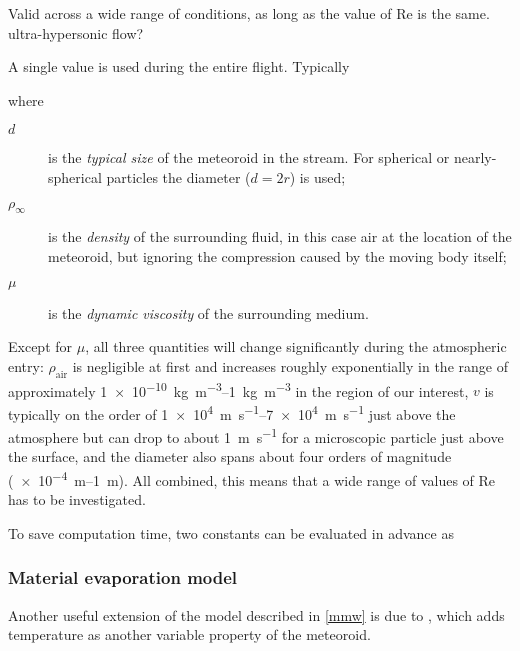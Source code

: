         Valid across a wide range of conditions, as long as the value of Re is the same.
        ultra-hypersonic flow?

        A single value is used during the entire flight. Typically


        where
        \begin{description}
            \item[$d$] is the \emph{typical size} of the meteoroid in the stream.
                For spherical or nearly-spherical particles the diameter ($d = 2r$) is used;
            \item[$\rho_\infty$] is the \emph{density} of the surrounding fluid, in this case
                air at the location of the meteoroid, but ignoring the compression caused
                by the moving body itself;
            \item[$\mu$] is the \emph{dynamic viscosity} of the surrounding medium.
        \end{description}

        Except for $\mu$, all three quantities will change significantly
        during the atmospheric entry: $\rho_\mathrm{air}$ is negligible at first
        and increases roughly exponentially in the range of approximately \SIrange{1e-10}{1}{\kilo\gram\per\metre\cubed}
        in the region of our interest, $v$ is typically on the order of \SIrange{1e4}{7e4}{\metre\per\second}
        just above the atmosphere but can drop to about \SI{1}{\metre\per\second}
        for a microscopic particle just above the surface, and the diameter also spans
        about four orders of magnitude (\SIrange{e-4}{1}{\metre}).
        All combined, this means that a wide range of values of $\mathrm{Re}$ has to be investigated.


        To save computation time, two constants can be evaluated in advance as


    \subsubsection{Material evaporation model} \label{mwh}
        Another useful extension of the model described in \cref{mmw} is due to
        \cite{hill+2005}, which adds temperature as another variable property of the meteoroid.


